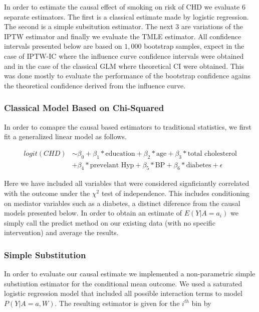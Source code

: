 \documentclass[]{article}
\begin{document}
In order to estimate the causal effect of smoking on risk of CHD we
evaluate 6 separate estimators. The first is a classical estimate made
by logistic regression. The second is a simple subsitution estimator.
The next 3 are variations of the IPTW estimator and finally we evaluate
the TMLE estimator. All confidence intervals presented below are based
on \(1,000\) bootstrap samples, expect in the case of IPTW-IC where the
influence curve confidence intervals were obtained and in the case of
the classical GLM where theoretical CI were obtained. This was done
mostly to evaluate the performance of the bootstrap confidence agains
the theoretical confidence derived from the influence curve.

\subsubsection{Classical Model Based on
Chi-Squared}\label{classical-model-based-on-chi-squared}

In order to comapre the causal based estimators to traditional
statistics, we first fit a generalized linear model as follows.

\[
\begin{aligned}
logit(CHD) &\sim \beta_0 + \beta_1*\text{education} + \beta_2*\text{age} +\beta_3*\text{total cholesterol}\\
&+\beta_4*\text{prevelant Hyp} + \beta_5*\text{BP} + \beta_6*\text{diabetes} + \epsilon
\end{aligned}
\]

Here we have included all variables that were considered signficiantly
correlated with the outcome under the \(\chi^2\) test of independence.
This includes conditioning on mediator variables such as a diabetes, a
distinct diference from the causal models presented below. In order to
obtain an estimate of \(E(Y | A=a_i)\) we simply call the predict method
on our existing data (with no specific intervention) and average the
results.

\subsubsection{Simple Substitution}\label{simple-substitution}

In order to evaluate our causal estimate we implemented a non-parametric
simple substiution estimator for the conditional mean outcome. We used a
saturated logistic regression model that included all possible
interaction terms to model \(P(Y | A=a ,W)\). The resulting estimator is
given for the \(i^{th}\) bin by
\end{document}
